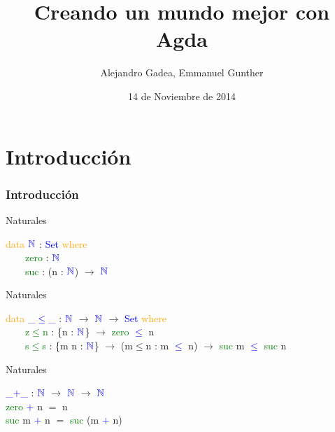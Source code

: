 \documentclass[xcolor=dvipsnames]{beamer} %
\newcommand{\cf}[1]{\textcolor{blue}{#1}}
\newcommand{\ct}[1]{\textcolor{blue}{#1}}
\newcommand{\cc}[1]{\textcolor{green}{#1}}
\newcommand{\ck}[1]{\textcolor{orange}{#1}}
\newcommand{\N}{\ct{\mathbb{N}}}
\newcommand{\ra}{\rightarrow}
\begin{document}
\title{Creando un mundo mejor con Agda}
\author{{Alejandro Gadea, Emmanuel Gunther}\\
\vspace*{0.5cm}}
\date{14 de Noviembre de 2014}
\frame{\titlepage}

\section{Introducci\'on}

\begin{frame}
\frametitle{Introducci\'on}

\begin{block}{Naturales}

\ck{data} $\N$ : \ct{Set} \ck{where}\\
\ \ \ \ \cc{zero} : $\N$\\
\ \ \ \ \cc{suc}  : (n : $\N$) $\ra$ $\N$

\end{block}

\pause

\begin{block}{Naturales}

\ck{data} \ct{\_$\leq$\_} : $\N$ $\ra$ $\N$ $\ra$ \ct{Set} \ck{where}\\
\ \ \ \ \cc{z$\leq$n} : \{n : $\N$\}                 $\ra$ \cc{zero}  \ct{$\leq$} n\\
\ \ \ \ \cc{s$\leq$s} : \{m n : $\N$\} $\ra$ (m$\leq$n : m \ct{$\leq$} n) $\ra$ \cc{suc} m \ct{$\leq$} \cc{suc} n

\end{block}

\pause

\begin{block}{Naturales}

\cf{\_$+$\_} : $\N$ $\ra$ $\N$ $\ra$ $\N$\\
\cc{zero}  \cf{$+$} n $=$ n\\
\cc{suc} m \cf{$+$} n $=$ \cc{suc} (m \cf{$+$} n)

\end{block}

\end{frame}
\end{document}
